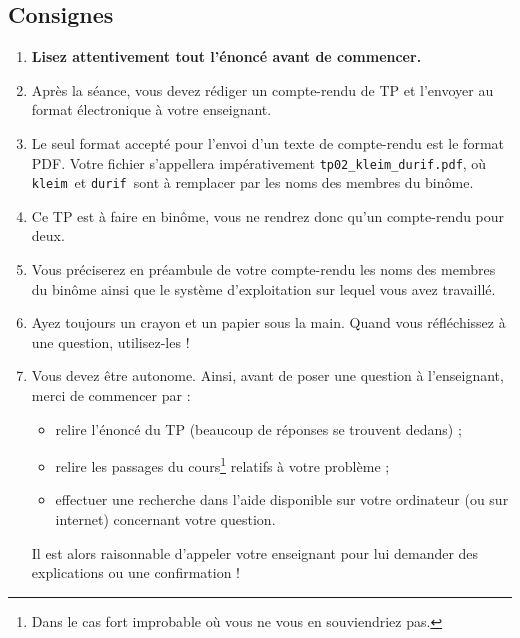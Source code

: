 \subsection{Consignes}
\begin{enumerate}
\item  \textbf{Lisez attentivement  tout l'énoncé
    avant de commencer.}
\item Après la séance, vous devez rédiger un compte-rendu de TP et
l'envoyer au format électronique à votre enseignant.
\item Le seul format accepté pour l'envoi d'un texte de compte-rendu est le
format PDF. Votre fichier s'appellera impérativement \texttt{tp02\_kleim\_durif.pdf}, où \og \texttt{kleim}\fg\ et \og \texttt{durif}\fg\ sont à remplacer par les noms des membres du binôme. 
\item Ce TP est à faire en binôme, vous ne rendrez donc qu'un compte-rendu pour deux.
\item Vous préciserez en préambule de votre compte-rendu les noms des membres du binôme ainsi que le système d'exploitation sur lequel vous avez travaillé. 
\item Ayez toujours un crayon et un papier sous la main. Quand vous réfléchissez à une question, utilisez-les !
\item Vous devez être autonome. Ainsi, avant de poser une question à l'enseignant, merci de commencer par :
\begin{itemize}
  \item relire l'énoncé du TP (beaucoup de réponses se trouvent dedans) ;
  \item relire les passages du cours\footnote{Dans le cas fort 
improbable où vous ne vous en souviendriez pas.} relatifs à votre problème ;
  \item effectuer une recherche dans l'aide disponible sur votre ordinateur (ou sur internet) concernant votre question.
\end{itemize}
  Il est alors raisonnable d'appeler votre enseignant pour lui demander des explications ou une confirmation !
\end{enumerate}

%
%


